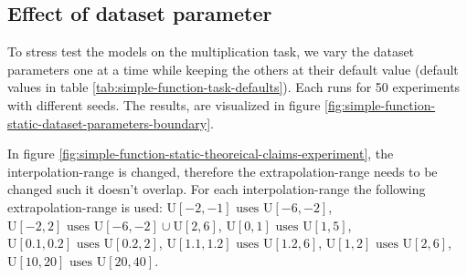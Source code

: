 \subsection{Effect of dataset parameter}
\label{sec:appendix-simple-function-task:dataset-parameter-effect}

To stress test the models on the multiplication task, we vary the dataset parameters one at a time while keeping the others at their default value (default values in table \ref{tab:simple-function-task-defaults}). Each runs for 50 experiments with different seeds. The results, are visualized in figure \ref{fig:simple-function-static-dataset-parameters-boundary}.

In figure \ref{fig:simple-function-static-theoreical-claims-experiment}, the interpolation-range is changed, therefore the extrapolation-range needs to be changed such it doesn't overlap. For each interpolation-range the following extrapolation-range is used: ${\mathrm{U}[-2,-1] \text{ uses } \mathrm{U}[-6,-2]}$, ${\mathrm{U}[-2,2] \text{ uses } \mathrm{U}[-6,-2] \cup \mathrm{U}[2,6]}$, ${\mathrm{U}[0,1] \text{ uses } \mathrm{U}[1,5]}$, ${\mathrm{U}[0.1,0.2] \text{ uses } \mathrm{U}[0.2,2]}$, ${\mathrm{U}[1.1,1.2] \text{ uses } \mathrm{U}[1.2,6]}$, ${\mathrm{U}[1,2] \text{ uses } \mathrm{U}[2,6]}$, ${\mathrm{U}[10, 20] \text{ uses } \mathrm{U}[20, 40]}$.

